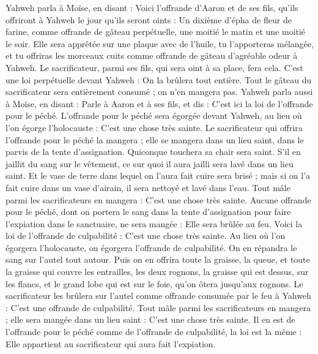 \begin{multicols}{2}
Yahweh parla à Moïse, en disant :
Voici l'offrande d'Aaron et de ses fils, qu’ils offriront à Yahweh le jour qu'ils seront oints : Un dixième d'épha de fleur de farine, comme offrande de gâteau perpétuelle, une moitié le matin et une moitié le soir.
Elle sera apprêtée sur une plaque avec de l'huile, tu l'apporteras mélangée, et tu offriras les morceaux cuits comme offrande de gâteau d’agréable odeur à Yahweh.
Le sacrificateur, parmi ses fils, qui sera oint à sa place, fera cela. C’est une loi perpétuelle devant Yahweh : On la  brûlera tout entière.
Tout le gâteau du sacrificateur sera entièrement consumé ; on n’en mangera pas.
Yahweh parla aussi à Moïse, en disant :
Parle à Aaron et à ses fils, et dis : C'est ici la loi de l’offrande pour le péché. L’offrande pour le péché sera égorgée devant Yahweh, au lieu où l’on égorge l'holocauste : C'est une chose très sainte.
Le sacrificateur qui offrira l’offrande pour le péché la mangera ; elle se mangera dans un lieu saint, dans le parvis de la tente d'assignation.
Quiconque touchera sa chair sera saint. S'il en jaillit du sang sur le vêtement, ce sur quoi il aura jailli sera lavé dans un lieu saint.
Et le vase de terre dans lequel on l'aura fait cuire sera brisé ; mais si on l'a fait cuire dans un vase d'airain, il sera nettoyé et lavé dans l'eau.
Tout mâle parmi les sacrificateurs en mangera : C'est une chose très sainte.
Aucune offrande pour le péché, dont on portera le sang dans la tente d'assignation pour faire l’expiation dans le sanctuaire, ne sera mangée : Elle sera brûlée au feu.
\VerseOne{}Voici la loi de l’offrande de culpabilité : C’est une chose très sainte.
Au lieu où l’on égorgera l’holocauste, on égorgera l’offrande de culpabilité. On en répandra le sang sur l’autel tout autour.
Puis on en offrira toute la graisse, la queue, et toute la graisse qui couvre les entrailles,
les deux rognons, la graisse qui est dessus, sur les flancs, et le grand lobe qui est sur le foie, qu’on ôtera jusqu’aux rognons.
Le sacrificateur les brûlera sur l’autel comme offrande consumée par le feu à Yahweh : C’est une offrande de culpabilité.
Tout mâle parmi les sacrificateurs en mangera ; elle sera mangée dans un lieu saint : C’est une chose très sainte.
Il en est de l’offrande pour le péché comme de l’offrande de culpabilité, la loi est la même : Elle appartient au sacrificateur qui aura fait l’expiation.

\end{multicols}
